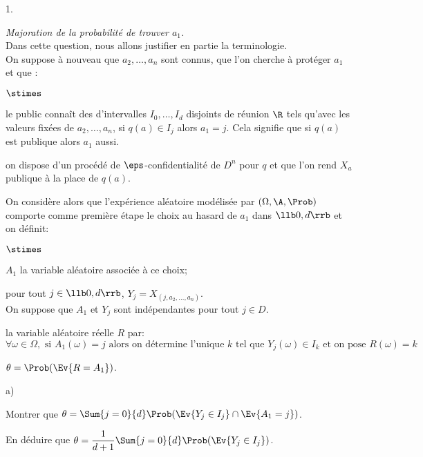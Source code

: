 \begin{noliste}{1.}
  \setcounter{enumi}{12} %
  \setlength{\itemsep}{4mm}
\item {\em Majoration de la probabilité de trouver $a_1$.}\\
  Dans cette question, nous allons justifier en partie la
  terminologie.\\
  On suppose à nouveau que $a_2, \ldots ,a_n$ sont connus, que l'on
  cherche à protéger $a_1$ et que :
  \begin{noliste}{$\stimes$}
  \item le public connaît des d'intervalles $I_0,\ldots,I_d$ disjoints
    de réunion $\R$ tels qu'avec les valeurs fixées de $a_2, \ldots,
    a_n$, si $q(a) \in I_j$ alors $a_1 = j$. Cela signifie que si
    $q(a)$ est publique alors $a_1$ aussi.
  \item on dispose d'un procédé de $\eps$-confidentialité de $D^n$
    pour $q$ et que l'on rend $X_a$ publique à la place de $q(a)$.
  \end{noliste}
  On considère alors que l'expérience aléatoire modélisée par
  $(\Omega, \A, \Prob)$ comporte comme première étape le choix au
  hasard de $a_1$ dans $\llb 0, d \rrb$ et on définit:
  \begin{noliste}{$\stimes$}
  \item $A_1$ la variable aléatoire associée à ce choix;
  \item pour tout $j \in \llb 0, d \rrb$, $Y_j = X_{(j, a_2, \ldots,
      a_n)}$. \\
    On suppose que $A_1$ et $Y_j$ sont indépendantes pour tout $j\in
    D$.
  \item la variable aléatoire réelle $R$ par:
    \[
    \forall \omega\in\Omega, \text{ si } A_1(\omega) = j \text{ alors
      on détermine l'unique } k \text{ tel que } Y_j(\omega)\in I_k
    \text{ et on pose } R(\omega)=k
    \]
  \item $\theta = \Prob(\Ev{R = A_1})$.
  \end{noliste}




  \begin{noliste}{a)}
    \setlength{\itemsep}{2mm} %
  \item Montrer que $\theta = \Sum{j=0}{d} \Prob(\Ev{Y_j\in I_j} \cap
    \Ev{A_1=j})$.

    

  \item En déduire que $\theta = \dfrac{1}{d+1} \Sum{j=0}{d}
    \Prob(\Ev{Y_j \in I_j})$.


\end{noliste}
\end{noliste}
